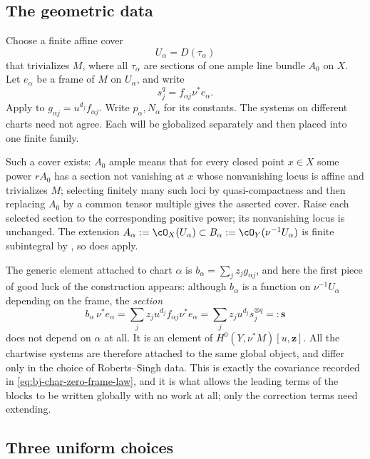\subsection{The geometric data}
\label{sec:ch44-global-data}

Choose a finite affine cover
\[
                         U_\alpha=D(\tau_\alpha)
\tag{44.15}\label{eq:bj-char-zero-affine-cover}
\]
that trivializes $M$, where all $\tau_\alpha$ are sections of one ample
line bundle $A_0$ on $X$.
Let $e_\alpha$ be a frame of $M$ on $U_\alpha$, and write
\[
                         s_j^q=f_{\alpha j}\nu^*e_\alpha.
\]
Apply  to
$g_{\alpha j}=u^{d_j}f_{\alpha j}$.
Write $p_\alpha,N_\alpha$ for its constants.
The systems on different charts need not agree.
Each will be globalized separately and then placed into one finite family.

Such a cover exists: $A_0$ ample means that for every closed point
$x\in X$ some power $rA_0$ has a section not vanishing at $x$ whose
nonvanishing locus is affine and trivializes $M$; selecting finitely many such loci by quasi-compactness and then
replacing $A_0$ by a common tensor multiple gives the asserted cover.
Raise each selected section to the corresponding positive power;
its nonvanishing locus is unchanged.  The
extension $A_\alpha:=\cO_X(U_\alpha)\subset B_\alpha:=\cO_Y(\nu^{-1}U_\alpha)$
is finite subintegral by , so
 does apply.

The generic element attached to chart $\alpha$ is
$b_\alpha=\sum_jz_jg_{\alpha j}$, and here the first piece of good luck of
the construction appears: although $b_\alpha$ is a function on
$\nu^{-1}U_\alpha$ depending on the frame, the \emph{section}
\[
 b_\alpha\,\nu^*e_\alpha
 =\sum_jz_ju^{d_j}f_{\alpha j}\nu^*e_\alpha
 =\sum_jz_ju^{d_j}s_j^{\otimes q}
 =:\mathbf s
\]
does not depend on $\alpha$ at all.  It is an element of
$H^0(Y,\nu^*M)[u,\mathbf z]$.  All the
chartwise systems are therefore attached to the same global object, and
differ only in the choice of Roberts--Singh data.  This is exactly the
covariance recorded in \eqref{eq:bj-char-zero-frame-law}, and it is what
allows the leading terms of the blocks to be written globally with no work
at all; only the correction terms need extending.

\subsection{Three uniform choices}
\label{sec:ch44-uniform-choices}

